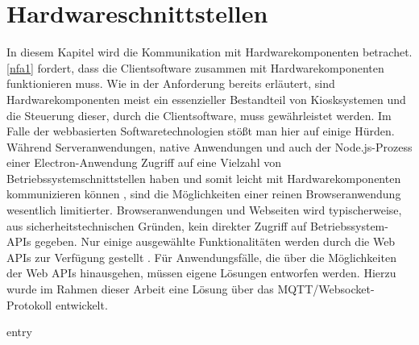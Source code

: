 \chapter{Hardwareschnittstellen}
\label{chap:hardwareschnittstellen}

In diesem Kapitel wird die Kommunikation mit Hardwarekomponenten betrachet.
\ref{nfa1} fordert, dass die Clientsoftware zusammen mit Hardwarekomponenten funktionieren muss. Wie in
der Anforderung bereits erläutert, sind Hardwarekomponenten meist ein essenzieller Bestandteil von Kiosksystemen
und die Steuerung dieser, durch die Clientsoftware, muss gewährleistet werden. Im Falle der webbasierten 
Softwaretechnologien stößt man hier auf einige Hürden.\\
Während Serveranwendungen, native Anwendungen und auch der Node.js-Prozess einer 
Electron-Anwendung Zugriff auf eine Vielzahl von Betriebssystemschnittstellen haben
und somit leicht mit Hardwarekomponenten kommunizieren können \cite{node-api-docs}, sind
die Möglichkeiten einer reinen Browseranwendung wesentlich limitierter. Browseranwendungen und Webseiten wird
typischerweise, aus sicherheitstechnischen Gründen, kein direkter Zugriff auf Betriebssystem-APIs gegeben.
Nur einige ausgewählte Funktionalitäten werden durch die Web APIs zur Verfügung gestellt \cite{web-apis}.
Für Anwendungsfälle, die über die Möglichkeiten der Web APIs hinausgehen, müssen eigene Lösungen entworfen 
werden. Hierzu wurde im Rahmen dieser Arbeit eine Lösung über das MQTT/Websocket-Protokoll entwickelt.


{entry}